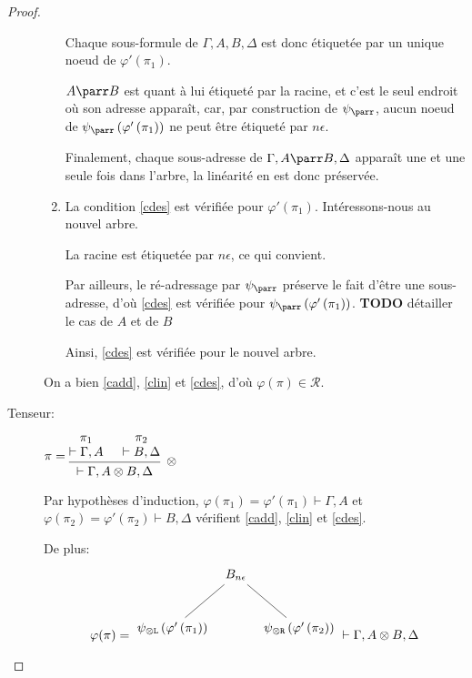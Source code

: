 \documentclass[11pt,a4paper]{article}
\theoremstyle{plain}
\theoremstyle{definition}
\theoremstyle{remark}
\newcommand*{\tensor}{\otimes}
\newcommand*{\namedproofv}[2]{\hypo{#1}\infer[no rule]{1}{\vdash #2}}
\newcommand*{\tensorv}[1]{\infer{2}[\ensuremath{\tensor}]{\vdash #1}}
\newcommand*{\someproof}{\pi}
\newcommand*{\sequent}{\Gamma}
\newcommand*{\sequentbis}{\Delta}
\newcommand*{\Left}{\textnormal{\texttt{L}}}
\newcommand*{\Right}{\textnormal{\texttt{R}}}
\newcommand*{\representations}{\ensuremath{\mathcal{R}}}
\newcommand*{\encode}{\ensuremath{\varphi}}
\newcommand*{\todo}{{\normalfont \textbf{TODO}} }
\begin{document}
\begin{proof}
\begin{description}
\begin{enumerate}
        Chaque sous-formule de $\sequent, A, B, \sequentbis$ est donc étiquetée par un unique noeud de $\encode ' \left( \pi_1 \right)$.
        
        $A \parr B$ est quant à lui étiqueté par la racine, et c'est le seul endroit où son adresse apparaît, car, par construction de $\psi_\parr$, aucun noeud de $\psi_\parr \left( \encode' \left( \pi_1 \right) \right)$ ne peut être étiqueté par $n \epsilon$.

        Finalement, chaque sous-adresse de $\sequent, A \parr B, \sequentbis$ apparaît une et une seule fois dans l'arbre, la linéarité en est donc préservée.
        
        \item La condition \ref{cdes} est vérifiée pour $\encode ' \left( \pi_1 \right)$. Intéressons-nous au nouvel arbre.
        
        La racine est étiquetée par $n \epsilon$, ce qui convient.

        Par ailleurs, le ré-adressage par $\psi_\parr$ préserve le fait d'être une sous-adresse, d'où \ref{cdes} est vérifiée pour $\psi_\parr \left( \encode' \left( \pi_1 \right) \right)$.
\todo{détailler le cas de $A$ et de $B$}

        Ainsi, \ref{cdes} est vérifiée pour le nouvel arbre.
    \end{enumerate} 

    On a bien \ref{cadd}, \ref{clin} et \ref{cdes}, d'où $\encode \left( \someproof \right) \in \representations$.

     \item[Tenseur:] $\someproof =
    \begin{prooftree}
      \namedproofv{\pi_1}{\sequent, A}
      \namedproofv{\pi_2}{B, \sequentbis}
      \tensorv{\sequent, A \tensor B, \sequentbis}
    \end{prooftree}$

    Par hypothèses d'induction, $\encode \left( \pi_1 \right) = \encode ' \left( \pi_1 \right) \vdash \sequent, A$ et $\encode \left( \pi_2 \right) = \encode ' \left( \pi_2 \right) \vdash B, \sequentbis$ vérifient \ref{cadd}, \ref{clin} et \ref{cdes}.
    
    De plus:
    \begin{equation*}
    \encode ( \someproof ) = \begin{tikzpicture}%
    [level distance=1.5cm,
    level 1/.style={sibling distance=3.5cm}]
    \node {$B_{n \epsilon}$}
        child {node {$\psi_{\tensor\Left} \left( \encode' \left( \pi_1 \right) \right)$}}
        child {node {$\psi_{\tensor\Right} \left( \encode' \left( \pi_2 \right) \right)$}
    };
    \end{tikzpicture} \vdash \sequent, A \tensor B, \sequentbis
    \end{equation*}


\end{description}
\end{proof}
\end{document}

